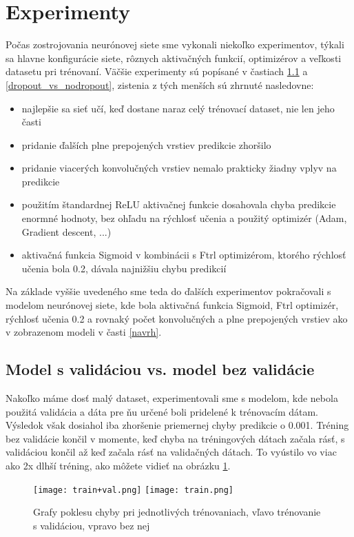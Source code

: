 \newpage

\section{Experimenty}
\label{experiments}
Počas zostrojovania neurónovej siete sme vykonali niekoľko experimentov, týkali sa hlavne konfigurácie siete, rôznych aktivačných funkcií, optimizérov a veľkosti datasetu pri trénovaní. Väčšie experimenty sú popísané v častiach \ref{val_vs_noval} a \ref{dropout_vs_nodropout}, zistenia z tých menších sú zhrnuté nasledovne:

\begin{itemize}
	\item najlepšie sa sieť učí, keď dostane naraz celý trénovací dataset, nie len jeho časti
	\item pridanie ďalších plne prepojených vrstiev predikcie zhoršilo
	\item pridanie viacerých konvolučných vrstiev nemalo prakticky žiadny vplyv na predikcie
	\item použitím štandardnej ReLU aktivačnej funkcie dosahovala chyba predikcie enormné hodnoty, bez ohľadu na rýchlosť učenia a použitý optimizér (Adam, Gradient descent, ...)
	\item aktivačná funkcia Sigmoid v kombinácii s Ftrl optimizérom, ktorého rýchlosť učenia bola 0.2, dávala najnižšiu chybu predikcií
\end{itemize}

Na základe vyššie uvedeného sme teda do ďalších experimentov pokračovali s modelom neurónovej siete, kde bola aktivačná funkcia Sigmoid, Ftrl optimizér, rýchlosť učenia 0.2 a rovnaký počet konvolučných a plne prepojených vrstiev ako v zobrazenom modeli v časti \ref{navrh}.

\subsection{Model s validáciou vs. model bez validácie}
\label{val_vs_noval}
Nakoľko máme dosť malý dataset, experimentovali sme s modelom, kde nebola použitá validácia a dáta pre ňu určené boli pridelené k trénovacím dátam. Výsledok však dosiahol iba zhoršenie priemernej chyby predikcie o 0.001. Tréning bez validácie končil v momente, keď chyba na tréningových dátach začala rásť, s validáciou končil až keď začala rásť na validačných dátach. To vyústilo vo viac ako 2x dlhší tréning, ako môžete vidieť na obrázku \ref{validation_graph}. 

	\begin{figure}[H]
			\texttt{[image: train+val.png]}
			\texttt{[image: train.png]}
		\caption[Trénovanie s validáciou vs. trénovanie bez validácie]{Grafy poklesu chyby pri jednotlivých trénovaniach, vľavo trénovanie s validáciou, vpravo bez nej}\label{validation_graph}
	\end{figure}
	
